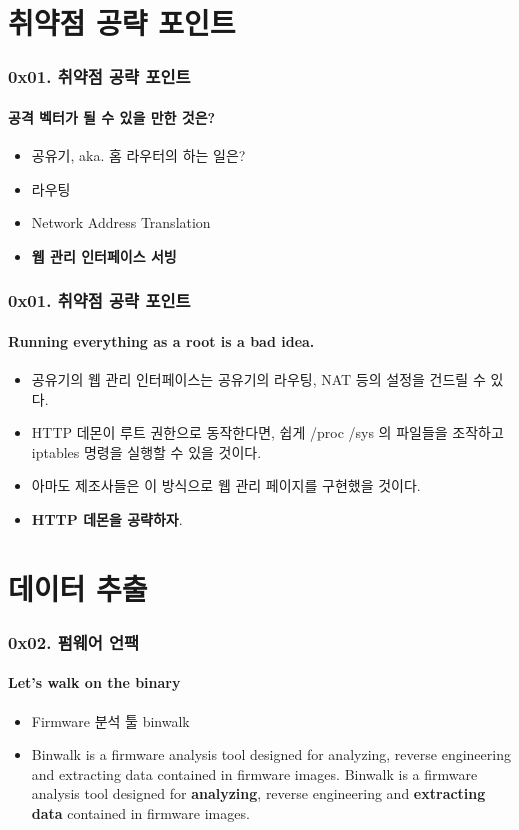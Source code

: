 \documentclass {beamer}
\begin{document}
\section[Section]{취약점 공략 포인트}
\begin{frame}
  \frametitle{0x01. 취약점 공략 포인트}
  \framesubtitle{공격 벡터가 될 수 있을 만한 것은?}

  \begin{itemize}
  \item 공유기, aka. 홈 라우터의 하는 일은?
  \item<2-> 라우팅
  \item<2-> Network Address Translation
  \item<2-> \textbf{웹 관리 인터페이스 서빙}
  \end{itemize}
\end{frame}

\begin{frame}
  \frametitle{0x01. 취약점 공략 포인트}
  \framesubtitle{Running everything as a root is a bad idea.}

  \begin{itemize}
  \item 공유기의 웹 관리 인터페이스는 공유기의 라우팅, NAT 등의 설정을 건드릴 수 있다.
  \item<2-> HTTP 데몬이 루트 권한으로 동작한다면, 쉽게 /proc /sys 의 파일들을 조작하고 iptables 명령을 실행할 수 있을 것이다.
  \item<2-> 아마도 제조사들은 이 방식으로 웹 관리 페이지를 구현했을 것이다.
  \item<3-> \textbf{HTTP 데몬을 공략하자}.
  \end{itemize}
\end{frame}

\section[Section]{데이터 추출}
\begin{frame}
  \frametitle{0x02. 펌웨어 언팩}
  \framesubtitle{Let's walk on the binary}

  \begin{itemize}
  \item<1-> Firmware 분석 툴 binwalk
  \item<2->
     {Binwalk is a firmware analysis tool designed for analyzing, reverse engineering and extracting data contained in firmware images.}
     {Binwalk is a firmware analysis tool designed for \textbf{analyzing}, reverse engineering and \textbf{extracting data} contained in firmware images.}
  \end{itemize}
\end{frame}
\end{document}
